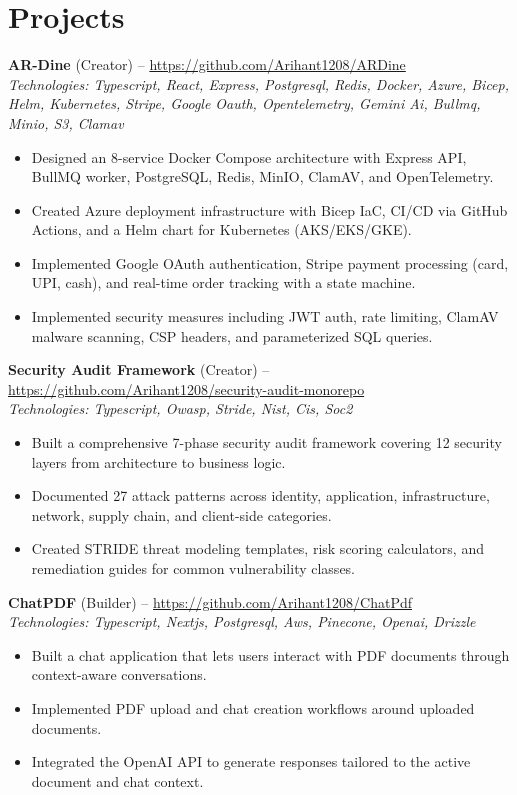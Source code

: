 \documentclass[11pt,a4paper]{article}
\begin{document}
\section{Projects}
\textbf{AR-Dine} (Creator) -- \href{https://github.com/Arihant1208/ARDine}{https://github.com/Arihant1208/ARDine}
\\ \textit{Technologies: Typescript, React, Express, Postgresql, Redis, Docker, Azure, Bicep, Helm, Kubernetes, Stripe, Google Oauth, Opentelemetry, Gemini Ai, Bullmq, Minio, S3, Clamav}
\begin{itemize}
  \item Designed an 8-service Docker Compose architecture with Express API, BullMQ worker, PostgreSQL, Redis, MinIO, ClamAV, and OpenTelemetry.
  \item Created Azure deployment infrastructure with Bicep IaC, CI/CD via GitHub Actions, and a Helm chart for Kubernetes (AKS/EKS/GKE).
  \item Implemented Google OAuth authentication, Stripe payment processing (card, UPI, cash), and real-time order tracking with a state machine.
  \item Implemented security measures including JWT auth, rate limiting, ClamAV malware scanning, CSP headers, and parameterized SQL queries.
\end{itemize}
\vspace{2pt}
\textbf{Security Audit Framework} (Creator) -- \href{https://github.com/Arihant1208/security-audit-monorepo}{https://github.com/Arihant1208/security-audit-monorepo}
\\ \textit{Technologies: Typescript, Owasp, Stride, Nist, Cis, Soc2}
\begin{itemize}
  \item Built a comprehensive 7-phase security audit framework covering 12 security layers from architecture to business logic.
  \item Documented 27 attack patterns across identity, application, infrastructure, network, supply chain, and client-side categories.
  \item Created STRIDE threat modeling templates, risk scoring calculators, and remediation guides for common vulnerability classes.
\end{itemize}
\vspace{2pt}
\textbf{ChatPDF} (Builder) -- \href{https://github.com/Arihant1208/ChatPdf}{https://github.com/Arihant1208/ChatPdf}
\\ \textit{Technologies: Typescript, Nextjs, Postgresql, Aws, Pinecone, Openai, Drizzle}
\begin{itemize}
  \item Built a chat application that lets users interact with PDF documents through context-aware conversations.
  \item Implemented PDF upload and chat creation workflows around uploaded documents.
  \item Integrated the OpenAI API to generate responses tailored to the active document and chat context.
\end{itemize}
\vspace{2pt}
\end{document}
